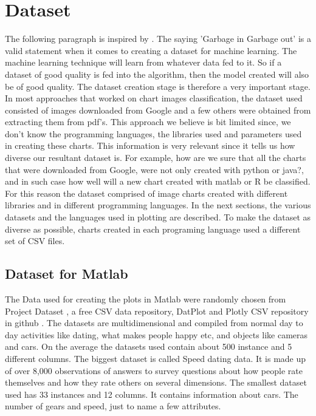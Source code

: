 \documentclass[12pt, a4paper,oneside]{report}
\begin{document}
\section{Dataset}
The following paragraph is inspired by \cite{edi}.
The saying 'Garbage in Garbage out' is a valid statement when it comes to creating a dataset for machine learning. The machine learning technique will learn from whatever data fed to it. So if a dataset of good quality is fed into the algorithm, then the model created will also be of good quality. The dataset creation stage is therefore a very important stage. In most approaches that worked on chart images classification, the dataset used consisted of images downloaded from Google and a few others were obtained from extracting them from pdf's. This approach we believe is bit limited since, we don't know the programming languages, the libraries used and parameters used in creating these charts. This information is very relevant since it tells us how diverse our resultant dataset is. For example, how are we sure that all the charts that were downloaded from Google, were not only created with python or java?, and in such case how well will a new chart created with matlab or R be classified. For this reason the dataset comprised of image charts created with different libraries and in different programming languages. In the next sections, the various datasets and the languages used in plotting are described. To make the dataset as diverse as possible, charts created in each programing language used a different set of CSV files. 

\subsection{Dataset for Matlab}
The Data used for creating the plots in Matlab were randomly chosen from Project Dataset \cite{projectdataset}, a free CSV data repository, DatPlot \cite{datplot} and Plotly CSV repository in github \cite{plotly}. The datasets are multidimensional and compiled from normal day to day activities like dating, what makes people happy etc, and objects like cameras and cars. On the average the datasets used contain about 500 instance and 5 different columns. The biggest dataset is called Speed dating data. It is made up of over 8,000 observations of answers to survey questions about how people rate themselves and how they rate others on several dimensions. The smallest dataset used has 33 instances and 12 columns. It contains information about cars. The number of gears and speed, just to name a few attributes.
\end{document}
